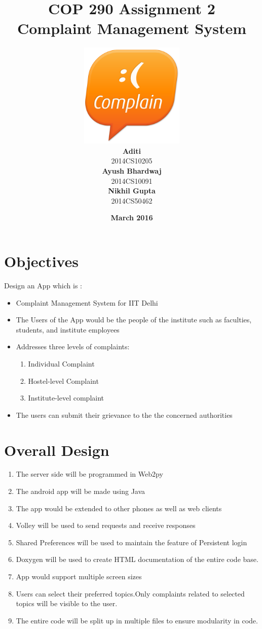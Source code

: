 \documentclass{article}
\title{\vspace*{\fill} \textbf{COP 290 Assignment 2}
	  \\ {\Large \textbf{Complaint Management System}}
}
\author{
	\vspace{5mm} \includegraphics[width=5cm]{logo.png} \\
	 \textbf{Aditi}\\
	2014CS10205 \vspace{2mm} \\
	\textbf{Ayush Bhardwaj}\\ 
	2014CS10091 \vspace{2mm} \\
	\textbf{Nikhil Gupta}\\ 
	2014CS50462 \vspace{2mm}
}
\date{\vspace{3mm} \textbf{March 2016} \vspace*{\fill}}
\begin{document}
	\maketitle

	\newpage

	\tableofcontents

	\newpage

	\section{Objectives}
		Design an App which is :
		\begin{itemize} 
			\item Complaint Management System for IIT Delhi
			\item The Users of the App would be the people of the institute such as faculties, students, and institute employees
			\item Addresses three levels of complaints: 
				\begin{enumerate}
					\item Individual Complaint 
					\item Hostel-level Complaint
					\item Institute-level complaint
				\end{enumerate}
			\item The users can submit their grievance to the the concerned authorities
		\end{itemize}
	\section{Overall Design}
				\begin{enumerate}
			\item The server side will be programmed in Web2py ~\cite{Web2py_Basics} 
			\item The android app will be made using Java
			\item The app would be extended to other phones as well as web clients
			\item Volley will be used to send requests and receive responses
			\item Shared Preferences will be used to maintain the feature of Persistent login 
			\item Doxygen will be used to create HTML documentation of the entire code base.
			\item App would support multiple screen sizes ~\cite{multiple_screen_sizes}
			\item Users can select their preferred topics.Only complaints related to selected topics will be visible to the user.
			\item The entire code will be split up in multiple files to ensure modularity in code. 
		\end{enumerate}
\end{document}
